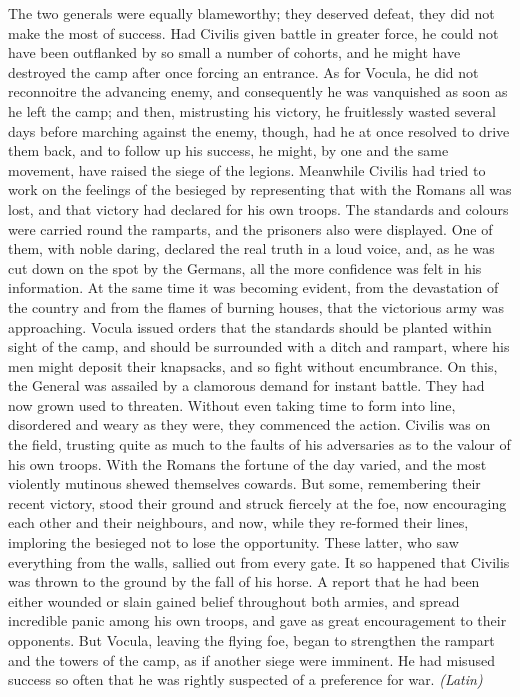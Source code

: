 The two generals were equally blameworthy; they deserved defeat, they did not make the most of success. Had Civilis given battle in greater force, he could not have been outflanked by so small a number of cohorts, and he might have destroyed the camp after once forcing an entrance. As for Vocula, he did not reconnoitre the advancing enemy, and consequently he was vanquished as soon as he left the camp; and then, mistrusting his victory, he fruitlessly wasted several days before marching against the enemy, though, had he at once resolved to drive them back, and to follow up his success, he might, by one and the same movement, have raised the siege of the legions. Meanwhile Civilis had tried to work on the feelings of the besieged by representing that with the Romans all was lost, and that victory had declared for his own troops. The standards and colours were carried round the ramparts, and the prisoners also were displayed. One of them, with noble daring, declared the real truth in a loud voice, and, as he was cut down on the spot by the Germans, all the more confidence was felt in his information. At the same time it was becoming evident, from the devastation of the country and from the flames of burning houses, that the victorious army was approaching. Vocula issued orders that the standards should be planted within sight of the camp, and should be surrounded with a ditch and rampart, where his men might deposit their knapsacks, and so fight without encumbrance. On this, the General was assailed by a clamorous demand for instant battle. They had now grown used to threaten. Without even taking time to form into line, disordered and weary as they were, they commenced the action. Civilis was on the field, trusting quite as much to the faults of his adversaries as to the valour of his own troops. With the Romans the fortune of the day varied, and the most violently mutinous shewed themselves cowards. But some, remembering their recent victory, stood their ground and struck fiercely at the foe, now encouraging each other and their neighbours, and now, while they re-formed their lines, imploring the besieged not to lose the opportunity. These latter, who saw everything from the walls, sallied out from every gate. It so happened that Civilis was thrown to the ground by the fall of his horse. A report that he had been either wounded or slain gained belief throughout both armies, and spread incredible panic among his own troops, and gave as great encouragement to their opponents. But Vocula, leaving the flying foe, began to strengthen the rampart and the towers of the camp, as if another siege were imminent. He had misused success so often that he was rightly suspected of a preference for war. \emph{(Latin)}

